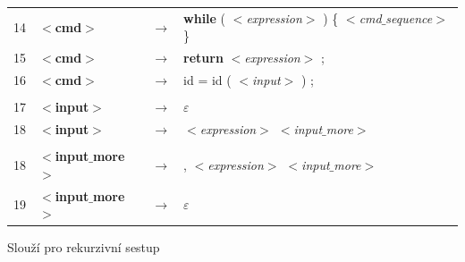 \documentclass[11pt,a4paper,titlepage]{article}
\begin{document}
\begin{center}
\begin{tabular}{c l c l}
					14&\textbf{$<$cmd$>$}             &      $\rightarrow$      &     \textbf{while} ( \emph{$<$expression$>$} ) \{ \emph{$<$cmd$\_$sequence$>$} \} \\  
					15&\textbf{$<$cmd$>$}             &      $\rightarrow$      &     \textbf{return} \emph{$<$expression$>$} ;    \\  
					16&\textbf{$<$cmd$>$}             &     	$\rightarrow$      &     \textdollar id = id ( \emph{$<$input$>$} ) ;  \\ 
					& & & \\ 
					17&\textbf{$<$input$>$}           &   	$\rightarrow$      &     $\varepsilon$      \\     
					18&\textbf{$<$input$>$}           &     	$\rightarrow$      &     \emph{$<$expression$>$ $<$input$\_$more$>$}  \\ 
	 				& & & \\                                                  
					18&\textbf{$<$input$\_$more$>$}     &  			$\rightarrow$      &     , \emph{$<$expression$>$ $<$input$\_$more$>$}  \\  
					19&\textbf{$<$input$\_$more$>$}     &  			$\rightarrow$      &     $\varepsilon$   \\                                             
				\end{tabular}
				\end{center}
	     \centering
			 \bigskip
				\bigskip
			\begin{Large} 
			Slouží pro rekurzivní sestup
			\end{Large}
		
\end{document}
